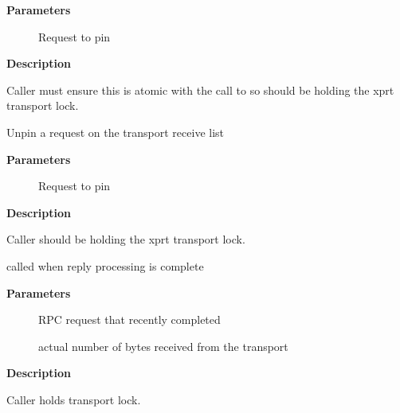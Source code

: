 \documentclass[a4paper,8pt,english]{sphinxmanual}
\begin{document}
\textbf{Parameters}
\begin{description}
\item[{}] \leavevmode
Request to pin

\end{description}

\textbf{Description}

Caller must ensure this is atomic with the call to {\hyperref[networking/kapi:c.xprt_lookup_rqst]{\emph{}}}
so should be holding the xprt transport lock.

\begin{fulllineitems}
\label{networking/kapi:c.xprt_unpin_rqst}
Unpin a request on the transport receive list

\end{fulllineitems}


\textbf{Parameters}
\begin{description}
\item[{}] \leavevmode
Request to pin

\end{description}

\textbf{Description}

Caller should be holding the xprt transport lock.

\begin{fulllineitems}
\label{networking/kapi:c.xprt_complete_rqst}
called when reply processing is complete

\end{fulllineitems}


\textbf{Parameters}
\begin{description}
\item[{}] \leavevmode
RPC request that recently completed

\item[{}] \leavevmode
actual number of bytes received from the transport

\end{description}

\textbf{Description}

Caller holds transport lock.
\end{document}
